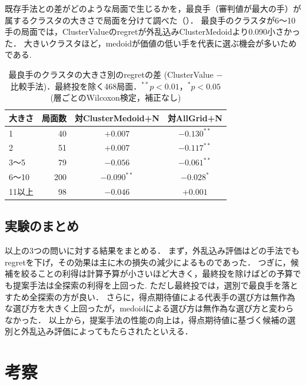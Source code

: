 \documentclass[submit]{ipsj}
\begin{document}
既存手法との差がどのような局面で生じるかを，最良手（審判値が最大の手）が属するクラスタの大きさで局面を分けて調べた（）．
最良手のクラスタが6〜10手の局面では，ClusterValueのregretが外乱込みClusterMedoidより0.090小さかった．
大きいクラスタほど，medoidが価値の低い手を代表に選ぶ機会が多いためである.

\begin{table}[tb]
\caption{最良手のクラスタの大きさ別のregretの差 (ClusterValue $-$ 比較手法)．最終投を除く468局面．$^{**}p<0.01$，$^{*}p<0.05$ (層ごとのWilcoxon検定，補正なし)}
\label{tab:csize}
\centering
\begin{tabular}{lrcc}\hline\hline
大きさ & 局面数 & 対ClusterMedoid+N & 対AllGrid+N \\\hline
1 & 40 & $+0.007$ & $-0.130^{**}$ \\
2 & 51 & $+0.007$ & $-0.117^{**}$ \\
3〜5 & 79 & $-0.056$ & $-0.061^{**}$ \\
6〜10 & 200 & $-0.090^{**}$ & $-0.028^{*}$ \\
11以上 & 98 & $-0.046$ & $+0.001$ \\\hline
\end{tabular}
\end{table}

\subsection{実験のまとめ}
以上の3つの問いに対する結果をまとめる．
まず，外乱込み評価はどの手法でもregretを下げ，その効果は主に木の損失の減少によるものであった．
つぎに，候補を絞ることの利得は計算予算が小さいほど大きく，最終投を除けばどの予算でも提案手法は全探索の利得を上回った.
ただし最終投では，選別で最良手を落とすため全探索の方が良い．
さらに，得点期待値による代表手の選び方は無作為な選び方を大きく上回ったが，medoidによる選び方は無作為な選び方と変わらなかった．
以上から，提案手法の性能の向上は，得点期待値に基づく候補の選別と外乱込み評価によってもたらされたといえる．

\section{考察}
\label{sec:discussion}
\end{document}
